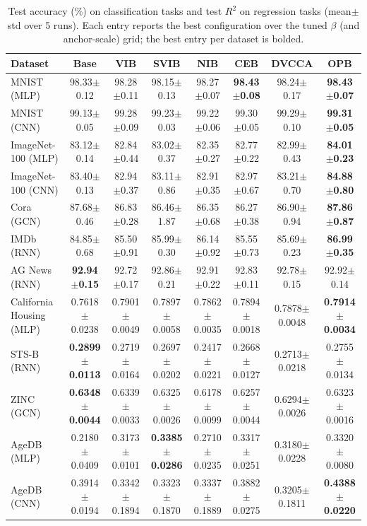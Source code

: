 \begin{table}[t]
\centering
\caption{Test accuracy (\%) on classification tasks and test $R^2$ on regression tasks (mean$\pm$std over 5 runs). Each entry reports the best configuration over the tuned $\beta$ (and anchor-scale) grid; the best entry per dataset is bolded.}
\label{tab:main_result}
\small
\begin{tabular}{lccccccc}
\hline
Dataset & Base & VIB & SVIB & NIB & CEB & DVCCA & OPB \\
\hline
MNIST (MLP) & 98.33$\pm$0.12 & 98.28$\pm$0.11 & 98.15$\pm$0.13 & 98.27$\pm$0.07 & \textbf{98.43$\pm$0.08} & 98.24$\pm$0.17 & \textbf{98.43$\pm$0.07} \\
MNIST (CNN) & 99.13$\pm$0.05 & 99.28$\pm$0.09 & 99.23$\pm$0.03 & 99.22$\pm$0.06 & 99.30$\pm$0.05 & 99.29$\pm$0.10 & \textbf{99.31$\pm$0.05} \\
ImageNet-100 (MLP) & 83.12$\pm$0.14 & 82.84$\pm$0.44 & 83.02$\pm$0.37 & 82.35$\pm$0.27 & 82.77$\pm$0.22 & 82.99$\pm$0.43 & \textbf{84.01$\pm$0.23} \\
ImageNet-100 (CNN) & 83.40$\pm$0.13 & 82.94$\pm$0.37 & 83.11$\pm$0.86 & 82.91$\pm$0.35 & 82.97$\pm$0.67 & 83.21$\pm$0.70 & \textbf{84.88$\pm$0.80} \\
Cora (GCN) & 87.68$\pm$0.46 & 86.83$\pm$0.28 & 86.46$\pm$1.87 & 86.35$\pm$0.68 & 86.27$\pm$0.38 & 86.90$\pm$0.94 & \textbf{87.86$\pm$0.87} \\
IMDb (RNN) & 84.85$\pm$0.68 & 85.50$\pm$0.91 & 85.99$\pm$0.30 & 86.14$\pm$0.92 & 85.55$\pm$0.73 & 85.69$\pm$0.23 & \textbf{86.99$\pm$0.35} \\
AG News (RNN) & \textbf{92.94$\pm$0.15} & 92.72$\pm$0.17 & 92.86$\pm$0.21 & 92.91$\pm$0.22 & 92.83$\pm$0.11 & 92.78$\pm$0.15 & 92.92$\pm$0.14 \\
\hline\hline
California Housing (MLP) & 0.7618$\pm$0.0238 & 0.7901$\pm$0.0049 & 0.7897$\pm$0.0058 & 0.7862$\pm$0.0035 & 0.7894$\pm$0.0018 & 0.7878$\pm$0.0048 & \textbf{0.7914$\pm$0.0034} \\
STS-B (RNN) & \textbf{0.2899$\pm$0.0113} & 0.2719$\pm$0.0164 & 0.2697$\pm$0.0202 & 0.2417$\pm$0.0221 & 0.2668$\pm$0.0127 & 0.2713$\pm$0.0218 & 0.2755$\pm$0.0134 \\
ZINC (GCN) & \textbf{0.6348$\pm$0.0044} & 0.6339$\pm$0.0033 & 0.6325$\pm$0.0026 & 0.6178$\pm$0.0099 & 0.6257$\pm$0.0044 & 0.6294$\pm$0.0026 & 0.6323$\pm$0.0016 \\
AgeDB (MLP) & 0.2180$\pm$0.0409 & 0.3173$\pm$0.0101 & \textbf{0.3385$\pm$0.0286} & 0.2710$\pm$0.0235 & 0.3317$\pm$0.0251 & 0.3180$\pm$0.0228 & 0.3320$\pm$0.0080 \\
AgeDB (CNN) & 0.3914$\pm$0.0194 & 0.3342$\pm$0.1894 & 0.3323$\pm$0.1870 & 0.3337$\pm$0.1889 & 0.3882$\pm$0.0275 & 0.3205$\pm$0.1811 & \textbf{0.4388$\pm$0.0220} \\
\hline
\end{tabular}
\end{table}
